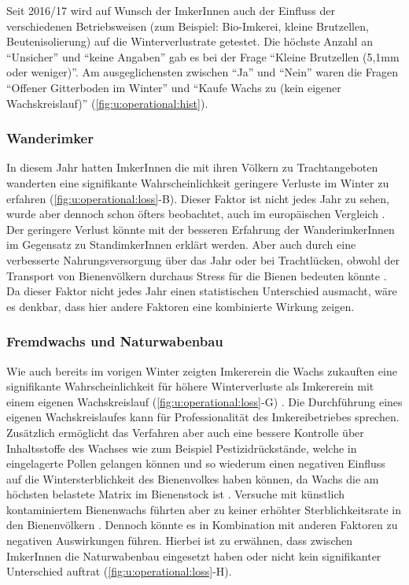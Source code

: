 Seit 2016/17 wird auf Wunsch der ImkerInnen auch der Einfluss der verschiedenen Betriebsweisen (zum Beispiel: Bio-Imkerei, kleine Brutzellen, Beutenisolierung) auf die Winterverlustrate getestet. Die höchste Anzahl an \enquote{Unsicher} und \enquote{keine Angaben} gab es bei der Frage \enquote{Kleine Brutzellen (5,1mm oder weniger)}. Am ausgeglichensten zwischen \enquote{Ja} und \enquote{Nein} waren die Fragen \enquote{Offener Gitterboden im Winter} und \enquote{Kaufe Wachs zu (kein eigener Wachskreislauf)} (\cref{fig:u:operational:hist}).

\subsubsection{Wanderimker}

In diesem Jahr hatten ImkerInnen die mit ihren Völkern zu Trachtangeboten wanderten eine signifikante Wahrscheinlichkeit geringere Verluste im Winter zu erfahren (\cref{fig:u:operational:loss}-B). Dieser Faktor ist nicht jedes Jahr zu sehen,  wurde aber dennoch schon öfters beobachtet, auch im europäischen Vergleich \citep{brodschneider2010, crailsheim2018, brodschneider2018, oberreiter2020}. Der geringere Verlust könnte mit der besseren Erfahrung der WanderimkerInnen im Gegensatz zu StandimkerInnen erklärt werden. Aber auch durch eine verbesserte Nahrungsversorgung über das Jahr oder bei Trachtlücken, obwohl der Transport von Bienenvölkern durchaus Stress für die Bienen bedeuten könnte \citep{vanderzee2014}. Da dieser Faktor nicht jedes Jahr einen statistischen Unterschied ausmacht, wäre es denkbar, dass hier andere Faktoren eine kombinierte Wirkung zeigen.

\subsubsection{Fremdwachs und Naturwabenbau}

Wie auch bereits im vorigen Winter zeigten Imkererein die Wachs zukauften eine signifikante Wahrscheinlichkeit für höhere Winterverluste als Imkererein mit einem eigenen Wachskreislauf (\cref{fig:u:operational:loss}-G) \citep{oberreiter2020}. Die Durchführung eines eigenen Wachskreislaufes kann für Professionalität des Imkereibetriebes sprechen. Zusätzlich ermöglicht das Verfahren aber auch eine bessere Kontrolle über Inhaltsstoffe des Wachses wie zum Beispiel Pestizidrückstände, welche in eingelagerte Pollen gelangen können und so wiederum einen negativen Einfluss auf die Wintersterblichkeit des Bienenvolkes haben können, da Wachs die am höchsten belastete Matrix im Bienenstock ist \citep{calatayud-vernich2018, harriet2017}. Versuche mit künstlich kontaminiertem Bienenwachs führten aber zu keiner erhöhter Sterblichkeitsrate in den Bienenvölkern \citep{payne2019}. Dennoch könnte es in Kombination mit anderen Faktoren zu negativen Auswirkungen führen. 
\newline
Hierbei ist zu erwähnen, dass zwischen ImkerInnen die Naturwabenbau eingesetzt haben oder nicht kein signifikanter Unterschied auftrat (\cref{fig:u:operational:loss}-H). 


